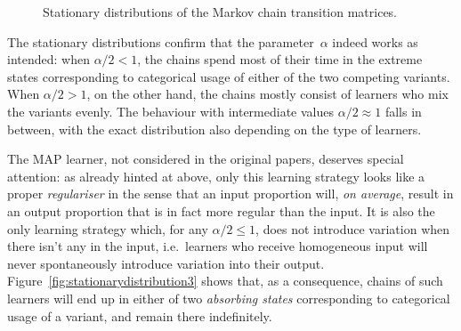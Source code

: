 \begin{figure}[htbp]

{\centering {}

}

\caption[Stationary distributions of the Markov chain transition matrices]{Stationary distributions of the Markov chain transition matrices.}\label{fig:stationarydistribution}
\end{figure}



The stationary distributions confirm that the parameter~$\alpha$ indeed works as intended: when $\alpha/2<1$, the chains spend most of their time in the extreme states corresponding to categorical usage of either of the two competing variants. %
When $\alpha/2>1$, on the other hand, the chains mostly consist of learners who mix the variants evenly. The behaviour with intermediate values $\alpha/2\approx1$ falls in between, with the exact distribution also depending on the type of learners.

The MAP learner, not considered in the original \citeauthor{Reali2009} papers, deserves special attention: as already hinted at above, only this learning strategy looks like a proper \emph{regulariser} in the sense that an input proportion will, \emph{on average}, result in an output proportion that is in fact more regular than the input. It is also the only learning strategy which, for any $\alpha/2\le1$, does not introduce variation when there isn't any in the input, i.e.~learners who receive homogeneous input will never spontaneously introduce variation into their output. Figure~\ref{fig:stationarydistribution3} shows that, as a consequence, chains of such learners will end up in either of two \emph{absorbing states} corresponding to categorical usage of a variant, and remain there indefinitely.


